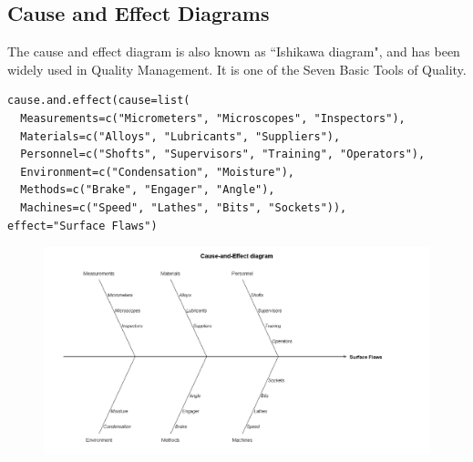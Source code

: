 \documentclass[SPC-MASTER.tex]{subfiles}
\begin{document}
\subsection{Cause and Effect Diagrams}
The cause and effect diagram is also known as ``Ishikawa diagram", and has been widely used in
Quality Management. It is one of the Seven Basic Tools of Quality.
\begin{framed}
\begin{verbatim}
cause.and.effect(cause=list(
  Measurements=c("Micrometers", "Microscopes", "Inspectors"),
  Materials=c("Alloys", "Lubricants", "Suppliers"),
  Personnel=c("Shofts", "Supervisors", "Training", "Operators"),
  Environment=c("Condensation", "Moisture"),
  Methods=c("Brake", "Engager", "Angle"),
  Machines=c("Speed", "Lathes", "Bits", "Sockets")),
effect="Surface Flaws")
\end{verbatim}
\end{framed}
\begin{figure}[h!]
\centering
\includegraphics[width=0.7\linewidth]{./qccfishbone}
\caption{}
\label{fig:qccfishbone}
\end{figure}
\newpage
\end{document}
